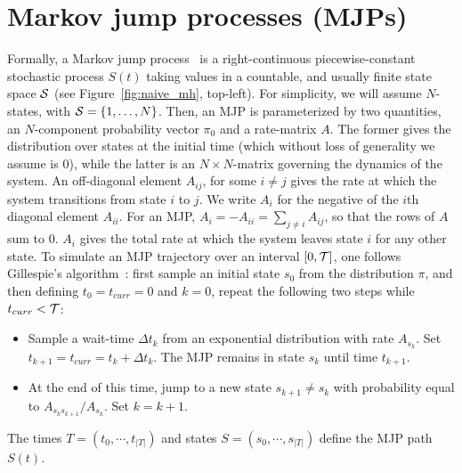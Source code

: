 \section{Markov jump processes (MJPs)} 
Formally, a Markov jump process~\cite{Cinlar1975} is a right-continuous 
piecewise-constant stochastic process $S(t)$ taking values in a countable, and 
usually finite state space ${\mathcal S}$ (see Figure~\ref{fig:naive_mh}, top-left).
For simplicity, we will assume $N$-states, with ${\mathcal S} = \{1,\ldots,N\}$. Then, 
an MJP is parameterized by two quantities, an $N$-component probability vector 
$\pi_0$ and a rate-matrix $A$. The former gives the distribution over states at 
the initial time (which without loss of generality we assume is $0$), while 
the latter is an $N \times N$-matrix governing the dynamics of the system.  An 
off-diagonal element $A_{ij}$, for some $i \neq j$ gives the rate at 
which the system transitions from state $i$ to $j$. We write $A_i$ for the 
negative of the $i$th diagonal element $A_{ii}$. For an MJP,
$A_i = -A_{ii} = \sum_{j \neq i} A_{ij}$, so that the rows of $A$ sum to $0$.  
$A_i$ gives the total rate at which the system leaves state $i$ for any other state.
To simulate an MJP trajectory over an interval $[0,{\mathcal T}]$, one follows 
Gillespie's algorithm~\cite{gillespie97}: 
first sample an initial state $s_0$ from the distribution $\pi$, and
then defining $t_0 = t_{curr} = 0$ and $k = 0$, repeat the following two steps while
$t_{curr} < {\mathcal T}$:
\begin{itemize}
  \item Sample a wait-time $\Delta t_k$ from an exponential distribution with rate 
    $A_{s_k}$.  Set $t_{k+1} = t_{curr} = t_{k} + \Delta t_k$.
    The MJP remains in state $s_k$ until time $t_{k+1}$.
  \item At the end of this time, jump to a new state $s_{k+1} \neq s_k$ with 
    probability equal to $A_{s_ks_{k+1}}/A_{s_k}$. Set $k=k+1$.
\end{itemize}
The times $T=(t_0, \cdots, t_{|T| })$ and states 
$S=(s_0, \cdots, s_{|T| })$ define the MJP path $S(t)$.

